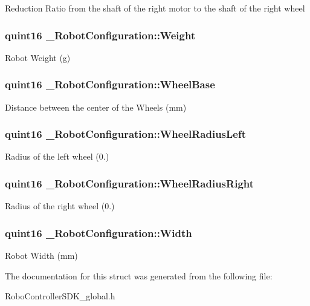 Reduction Ratio from the shaft of the right motor to the shaft of the right wheel \hypertarget{struct___robot_configuration_a9aa2a32a66e3d9559e9b43ccef43e74b}{
\subsubsection[{Weight}]{\setlength{\rightskip}{0pt plus 5cm}quint16 \-\_\-\-Robot\-Configuration\-::\-Weight}}\label{struct___robot_configuration_a9aa2a32a66e3d9559e9b43ccef43e74b}
Robot Weight (g) \hypertarget{struct___robot_configuration_ad18b7c6607d189b0507c67f584d7213c}{
\subsubsection[{Wheel\-Base}]{\setlength{\rightskip}{0pt plus 5cm}quint16 \-\_\-\-Robot\-Configuration\-::\-Wheel\-Base}}\label{struct___robot_configuration_ad18b7c6607d189b0507c67f584d7213c}
Distance between the center of the Wheels (mm) \hypertarget{struct___robot_configuration_a4fba24bbead4c38e30182570a9fc111b}{
\subsubsection[{Wheel\-Radius\-Left}]{\setlength{\rightskip}{0pt plus 5cm}quint16 \-\_\-\-Robot\-Configuration\-::\-Wheel\-Radius\-Left}}\label{struct___robot_configuration_a4fba24bbead4c38e30182570a9fc111b}
Radius of the left wheel (0.\-01mm) \hypertarget{struct___robot_configuration_a0cd7d7ca4eea7abb6c751f16a268a22c}{
\subsubsection[{Wheel\-Radius\-Right}]{\setlength{\rightskip}{0pt plus 5cm}quint16 \-\_\-\-Robot\-Configuration\-::\-Wheel\-Radius\-Right}}\label{struct___robot_configuration_a0cd7d7ca4eea7abb6c751f16a268a22c}
Radius of the right wheel (0.\-01mm) \hypertarget{struct___robot_configuration_ab9fcfe56d6fe56d0e7738e51dbcd062b}{
\subsubsection[{Width}]{\setlength{\rightskip}{0pt plus 5cm}quint16 \-\_\-\-Robot\-Configuration\-::\-Width}}\label{struct___robot_configuration_ab9fcfe56d6fe56d0e7738e51dbcd062b}
Robot Width (mm) 

The documentation for this struct was generated from the following file\-:\begin{DoxyCompactItemize}
\item 
Robo\-Controller\-S\-D\-K\-\_\-global.\-h\end{DoxyCompactItemize}

